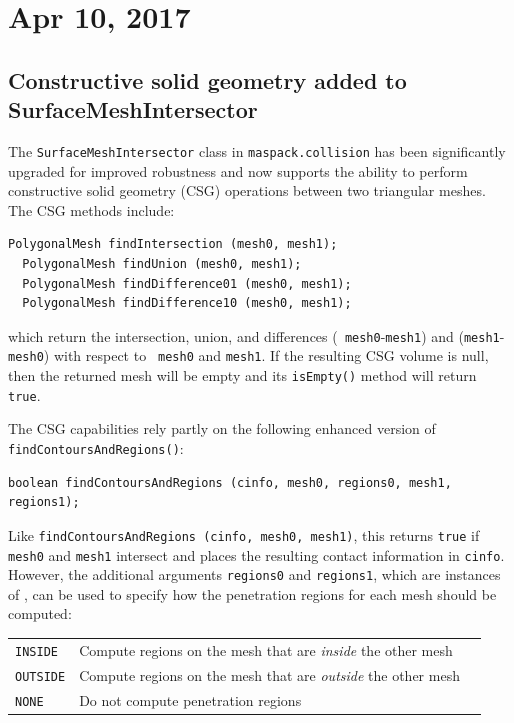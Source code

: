 \documentclass{article}
\begin{document}
\section*{Apr 10, 2017}

\subsection*{Constructive solid geometry added to SurfaceMeshIntersector}

The {\tt SurfaceMeshIntersector} class in {\tt maspack.collision} has
been significantly upgraded for improved robustness and now supports
the ability to perform constructive solid geometry (CSG) operations
between two triangular meshes. The CSG methods include:
%
\begin{lstlisting}[]
  PolygonalMesh findIntersection (mesh0, mesh1);
  PolygonalMesh findUnion (mesh0, mesh1);
  PolygonalMesh findDifference01 (mesh0, mesh1);
  PolygonalMesh findDifference10 (mesh0, mesh1);
\end{lstlisting}
%
which return the intersection, union, and differences ({\tt
mesh0}-{\tt mesh1}) and ({\tt mesh1}-{\tt mesh0}) with respect to {\tt
mesh0} and {\tt mesh1}. If the resulting CSG volume is null, then the
returned mesh will be empty and its {\tt isEmpty()} method will return
{\tt true}.

The CSG capabilities rely partly on the following enhanced version of
{\tt findContoursAndRegions()}:
%
\begin{lstlisting}[]
  boolean findContoursAndRegions (cinfo, mesh0, regions0, mesh1, regions1);
\end{lstlisting}
%
Like {\tt findContoursAndRegions (cinfo, mesh0, mesh1)}, this returns
{\tt true} if {\tt mesh0} and {\tt mesh1} intersect and places the
resulting contact information in {\tt cinfo}. However, the additional
arguments {\tt regions0} and {\tt regions1}, which are instances of
, can
be used to specify how the penetration regions for each mesh should be
computed:

\begin{tabular}{lll}
\hline
{\tt INSIDE} & 
Compute regions on the mesh that are {\it inside} the other mesh\\
{\tt OUTSIDE} & 
Compute regions on the mesh that are {\it outside} the other mesh\\
{\tt NONE} & 
Do not compute penetration regions\\
\hline
\end{tabular}
\end{document}

